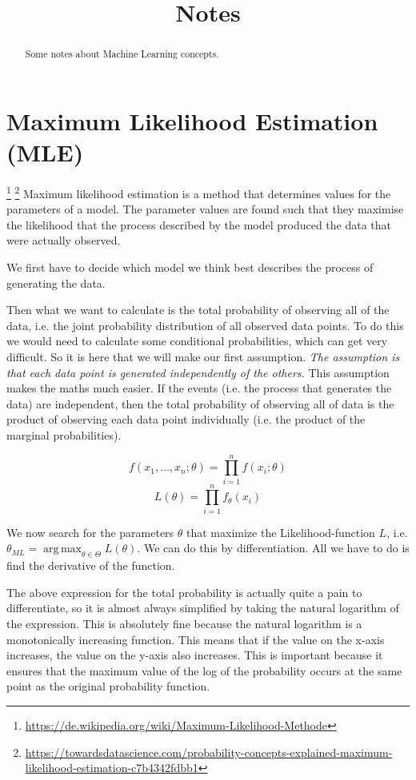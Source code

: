 \documentclass{scrartcl}
\DeclareMathOperator*{\argmax}{arg\,max}
\begin{document}
\title{Notes}

\maketitle

\begin{abstract}
Some notes about Machine Learning concepts.
\end{abstract}

\section{Maximum Likelihood Estimation (MLE)}
\footnote{\url{https://de.wikipedia.org/wiki/Maximum-Likelihood-Methode}} \footnote{\url{https://towardsdatascience.com/probability-concepts-explained-maximum-likelihood-estimation-c7b4342fdbb1}}
Maximum likelihood estimation is a method that determines values for the parameters of a model. The parameter values are found such that they maximise the likelihood that the process described by the model produced the data that were actually observed.

We first have to decide which model we think best describes the process of generating the data.

Then what we want to calculate is the total probability of observing all of the data, i.e. the joint probability distribution of all observed data points. To do this we would need to calculate some conditional probabilities, which can get very difficult. So it is here that we will make our first assumption. \textit{The assumption is that each data point is generated independently of the others.} This assumption makes the maths much easier. If the events (i.e. the process that generates the data) are independent, then the total probability of observing all of data is the product of observing each data point individually (i.e. the product of the marginal probabilities).

$$f(x_1, \dots, x_n; \theta) = \prod_{i=1}^n f(x_i; \theta)$$
$$L(\theta) = \prod_{i=1}^n f_{\theta}(x_i)$$

We now search for the parameters $\theta$ that maximize the Likelihood-function $L$, i.e. $\theta_{ML} = \argmax_{\theta \in \Theta} L(\theta)$. We can do this by differentiation. All we have to do is find the derivative of the function.

The above expression for the total probability is actually quite a pain to differentiate, so it is almost always simplified by taking the natural logarithm of the expression. This is absolutely fine because the natural logarithm is a monotonically increasing function. This means that if the value on the x-axis increases, the value on the y-axis also increases. This is important because it ensures that the maximum value of the log of the probability occurs at the same point as the original probability function.
\end{document}
